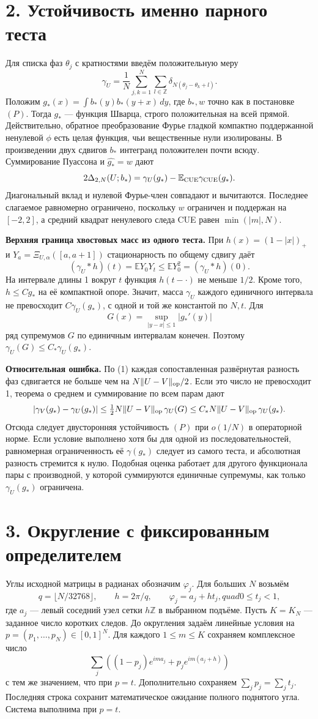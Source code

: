 \documentclass[11pt,a4paper]{article}
\newcommand{\EE}{\mathbb E}
\newcommand{\Z}{\mathbb Z}
\newcommand{\sect}[1]{\section*{\sffamily\color{ink}#1}}
\newcommand{\subt}[1]{\par\medskip\noindent\textbf{#1.}\quad}
\begin{document}
\newpage
\sect{2. Устойчивость именно парного теста}
Для списка фаз \(\theta_j\) с кратностями введём положительную меру
\[
  \gamma_U=\frac1N\sum_{j,k=1}^N\sum_{l\in\Z}
             \delta_{N(\theta_j-\theta_k+l)} .
\]
Положим \(g_*(x)=\int b_*(y)b_*(y+x)\,dy\), где \(b_*,w\) точно как в постановке \((P)\). Тогда \(g_*\) --- функция Шварца, строго положительная на всей прямой. Действительно, обратное преобразование Фурье гладкой компактно поддержанной ненулевой \(\phi\) есть целая функция, чьи вещественные нули изолированы. В произведении двух сдвигов \(b_*\) интегранд положителен почти всюду. Суммирование Пуассона и \(\widehat{g_*}=w\) дают
\[
       2\Delta_{2,N}(U;b_*)
               =\gamma_U(g_*)-\EE_{\rm CUE}\gamma_{\rm CUE}(g_*).
\]
Диагональный вклад и нулевой Фурье-член совпадают и вычитаются. Последнее слагаемое равномерно ограничено, поскольку \(w\) ограничен и поддержан на \([-2,2]\), а средний квадрат ненулевого следа CUE равен \(\min(|m|,N)\).

\subt{Верхняя граница хвостовых масс из одного теста}
При \(h(x)=(1-|x|)_+\) и \(Y_a=\Xi_{U,\alpha}([a,a+1])\) стационарность по общему сдвигу даёт
\[
  (\gamma_U*h)(t)=\EE Y_0Y_t\le\EE Y_0^2=(\gamma_U*h)(0).
\]
На интервале длины 1 вокруг \(t\) функция \(h(t-\cdot)\) не меньше \(1/2\). Кроме того, \(h\le Cg_*\) на её компактной опоре. Значит, масса \(\gamma_U\) каждого единичного интервала не превосходит \(C\gamma_U(g_*)\), с одной и той же константой по \(N,t\). Для
\[
                 G(x)=\sup_{|y-x|\le1}|g_*'(y)|
\]
ряд супремумов \(G\) по единичным интервалам конечен. Поэтому \(\gamma_U(G)\le C_*\gamma_U(g_*)\).

\subt{Относительная ошибка}
По (1) каждая сопоставленная развёрнутая разность фаз сдвигается не больше чем на \(N\|U-V\|_{\rm op}/2\). Если это число не превосходит 1, теорема о среднем и суммирование по всем парам дают
\[
 |\gamma_V(g_*)-\gamma_U(g_*)|
           \le \tfrac12 N\|U-V\|_{\rm op}\,\gamma_U(G)
           \le C_*N\|U-V\|_{\rm op}\,\gamma_U(g_*).
\]
Отсюда следует двусторонняя устойчивость \((P)\) при \(o(1/N)\) в операторной норме. Если условие выполнено хотя бы для одной из последовательностей, равномерная ограниченность её \(\gamma(g_*)\) следует из самого теста, и абсолютная разность стремится к нулю. Подобная оценка работает для другого функционала пары с производной, у которой суммируются единичные супремумы, как только \(\gamma_U(g_*)\) ограничена.

\newpage
\sect{3. Округление с фиксированным определителем}
Углы исходной матрицы в радианах обозначим \(\varphi_j\). Для больших \(N\) возьмём
\[
           q=\lfloor N/32768\rfloor,\qquad h=2\pi/q,
           \qquad \varphi_j=a_j+h t_j,quad 0\le t_j<1,
\]
где \(a_j\) --- левый соседний узел сетки \(h\Z\) в выбранном подъёме. Пусть \(K=K_N\) --- заданное число коротких следов. До округления задаём линейные условия на \(p=(p_1,\ldots,p_N)\in[0,1]^N\). Для каждого \(1\le m\le K\) сохраняем комплексное число
\[
   \sum_j\left((1-p_j)e^{im a_j}+p_j e^{im(a_j+h)}\right)
\]
с тем же значением, что при \(p=t\). Дополнительно сохраняем \(\sum_jp_j=\sum_jt_j\). Последняя строка сохранит математическое ожидание полного поднятого угла. Система выполнима при \(p=t\).
\end{document}
